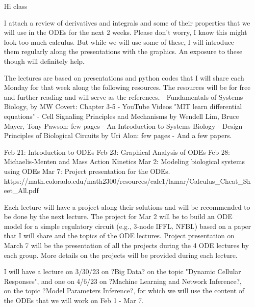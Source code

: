 

Hi class

I attach a review of derivatives and integrals and some of their properties that we will use in the ODEs for the next 2 weeks. Please don't worry, I know this might look too much calculus. But while we will use some of these, I will introduce them regularly along the presentations with the graphics. An exposure to these though will definitely help.

The lectures are based on presentations and python codes that I will share each Monday for that week along the following resources. The resources will be for free and further reading and will serve as the references.
- Fundamentals of Systems Biology, by MW Covert: Chapter 3-5
- YouTube Videos "MIT learn differential equations"
- Cell Signaling Principles and Mechanisms by Wendell Lim, Bruce Mayer, Tony Pawson: few pages
- An Introduction to Systems Biology  - Design Principles of Biological Circuits by Uri Alon: few pages
- And a few papers. 

Feb 21: Introduction to ODEs
Feb 23: Graphical Analysis of ODEs
Feb 28: Michaelis-Menten and Mass Action Kinetics
Mar 2: Modeling biological systems using ODEs
Mar 7: Project presentation for the ODEs. 
https://math.colorado.edu/math2300/resources/calc1/lamar/Calculus_Cheat_Sheet_All.pdf


Each lecture will have a project along their solutions and will be recommended to be done by the next lecture. The project for Mar 2 will be to build an ODE model for a simple regulatory circuit (e.g., 3-node IFFL, NFBL) based on a paper that I will share and the topics of the ODE lectures. Project presentation on March 7 will be the presentation of all the projects during the 4 ODE lectures by each group. More details on the projects will be  provided during each lecture.

I will have a lecture on 3/30/23 on ?Big Data? on the topic "Dynamic Cellular Responses", and one on 4/6/23 on ?Machine Learning and Network Inference?, on the topic ?Model Parameters Inference?, for which we will use the content of the ODEs that we will work on Feb 1 - Mar 7.